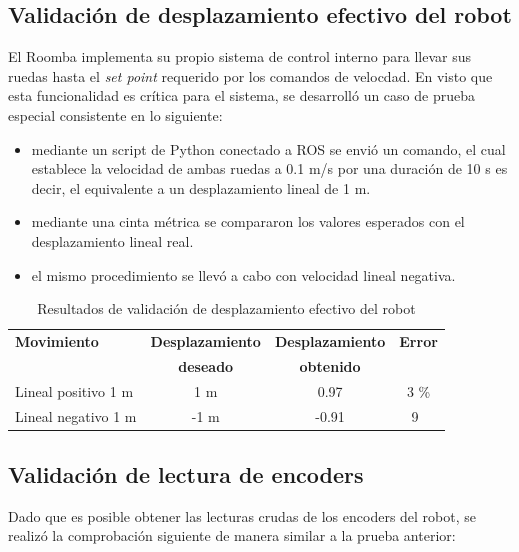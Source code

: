 \subsection{Validación de desplazamiento efectivo del robot}

El Roomba implementa su propio sistema de control interno para llevar sus ruedas hasta el \textit{set point} requerido por los comandos de velocdad. En visto que esta funcionalidad es crítica para el sistema, se desarrolló un caso de prueba especial consistente en lo siguiente:

\begin{itemize}
    \item mediante un script de Python conectado a ROS se envió un comando, el cual establece la velocidad de ambas ruedas a 0.1 m/s por una duración de 10 s es decir, el equivalente a un desplazamiento lineal de 1 m.
    \item mediante una cinta métrica se compararon los valores esperados con el desplazamiento lineal real.
    \item el mismo procedimiento se llevó a cabo con velocidad lineal negativa.
\end{itemize}

\begin{table}
    \centering
    \caption[Desplazamiento robot]{Resultados de validación de desplazamiento efectivo del robot}
    \begin{tabular}{lccc}
        \toprule
        \textbf{Movimiento} & \textbf{Desplazamiento} & \textbf{Desplazamiento} & \textbf{Error} \\
                            & \textbf{deseado}        & \textbf{obtenido}       &                \\
        \midrule
        Lineal positivo 1 m & 1 m                     & 0.97                    & 3 \%           \\
        Lineal negativo 1 m & -1 m                    & -0.91                   & 9~             \\
        \bottomrule
        \hline
    \end{tabular}
    \label{tab:desplazamientoRobot}
\end{table}

\subsection{Validación de lectura de encoders}

Dado que es posible obtener las lecturas crudas de los encoders del robot, se realizó la comprobación siguiente de manera similar a la prueba anterior:


